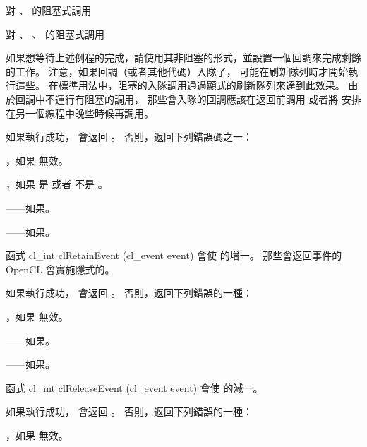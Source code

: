 \item 對 、  的阻塞式調用

\item 對 、 、  的阻塞式調用
\stopigBase

如果想等待上述例程的完成，請使用其非阻塞的形式，並設置一個回調來完成剩餘的工作。
注意，如果回調（或者其他代碼）入隊了，
可能在刷新隊列時才開始執行這些。
在標準用法中，阻塞的入隊調用通過顯式的刷新隊列來達到此效果。
由於回調中不運行有阻塞的調用，
那些會入隊的回調應該在返回前調用 
 或者將  安排在另一個線程中晚些時候再調用。

如果執行成功，  會返回 。
否則，返回下列錯誤碼之一：
\startigBase
\item {}，如果  無效。

\item {}，如果  是 
 或者  不是 。

\item {}——如果\scdevfailres。

\item {}——如果\schostfailres。
\stopigBase

函式
\startCLFUNC
cl_int clRetainEvent (cl_event event)
\stopCLFUNC
會使  的增一。
那些會返回事件的 OpenCL 會實施隱式的。

如果執行成功，  會返回 。
否則，返回下列錯誤的一種：
\startigBase
\item {}，如果  無效。

\item {}——如果\scdevfailres。

\item {}——如果\schostfailres。
\stopigBase

函式
\startCLFUNC
cl_int clReleaseEvent (cl_event event)
\stopCLFUNC
會使  的減一。

如果執行成功，  會返回 。
否則，返回下列錯誤的一種：
\startigBase
\item {}，如果  無效。

